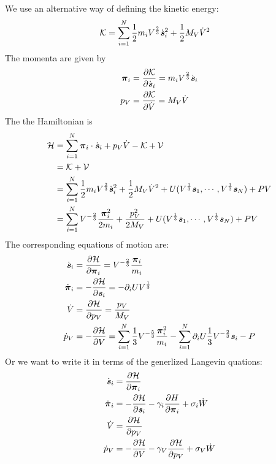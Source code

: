 \documentclass[aps, pre, preprint,unsortedaddress,a4paper,onecolumn]{revtex4}
\newcommand{\vect}[1]{\textbf{\textit{#1}}}
\newcommand{\mypi}{\boldsymbol\pi}
\begin{document}
We use an alternative way of defining the kinetic energy:
\begin{align}
  \mathcal K &=
  \sum_{i=1}^N \frac12 m_i V^{\frac23}\dot{\vect s}_i^2
  +
  \frac 12 {M_V} \dot V^2 
\end{align}
The momenta are given by
\begin{align}
  \mypi_i
  &=
  \frac{\partial \mathcal K}{\partial\dot{\vect s}_i}
  =m_i V^{\frac23}\dot{\vect s}_i\\
  p_V
  &=
  \frac{\partial \mathcal K}{\partial\dot{V}}
  = {M_V}\dot V
\end{align}
The the Hamiltonian is
\begin{align}
  \mathcal H
  &=
  \sum_{i=1}^N\mypi_i\cdot \dot{\vect s}_i +
  p_V \dot V - \mathcal K + \mathcal V \\
  & =
  \mathcal K + \mathcal V \\
  &=
  \sum_{i=1}^N \frac12 m_i V^{\frac23}\dot{\vect s}_i^2
  +
  \frac 12 {M_V} \dot V^2  +
  U(V^{\frac13}\vect s_1, \cdots, V^{\frac13}\vect s_N) + PV    \\
  & =
  \sum_{i=1}^N V^{-\frac23} \frac{\mypi_i^2}{2m_i}
  +
  \frac{p_V^2}{2{M_V}}
  +
  U(V^{\frac13}\vect s_1, \cdots, V^{\frac13}\vect s_N) + PV      
\end{align}
The corresponding equations of motion are:
\begin{align}
  \dot{\vect s}_i
  &=
  \frac{\partial \mathcal H}{\partial \mypi_i}
  =
  V^{-\frac23} \frac{\mypi_i}{m_i} \\
  \dot{\mypi}_i
  &=
  -\frac{\partial \mathcal H}{\partial \vect s_i}
  = -\partial_i U V^{\frac13} \\
  \dot{V} 
  &=
  \frac{\partial \mathcal H}{\partial p_V}
  = \frac{p_V}{M_V} \\
  \dot{p}_V
  &=
  -\frac{\partial \mathcal H}{\partial V}
  =
  \sum_{i=1}^N \frac13 V^{-\frac53} \frac{\mypi_i^2}{m_i}
  -
  \sum_{i=1}^N \partial_i U \frac13 V^{-\frac23} \vect s_i
  - P
\end{align}
Or we want to write it in terms of the generlized Langevin quations:
\begin{align}
  \dot{\vect s}_i
  &=
  \frac{\partial \mathcal H}{\partial \mypi_i} \\
  \dot{\mypi}_i
  &=
  -\frac{\partial \mathcal H}{\partial \vect s_i} - \gamma_i\frac{\partial H}{\partial\mypi_i} + \sigma_i \dot W\\
  \dot{V} 
  &=
  \frac{\partial \mathcal H}{\partial p_V}\\
  \dot{p}_V
  &=
  -\frac{\partial \mathcal H}{\partial V}
  -\gamma_V\frac{\partial \mathcal H}{\partial p_V} + \sigma_V \dot W
\end{align}
\end{document}
